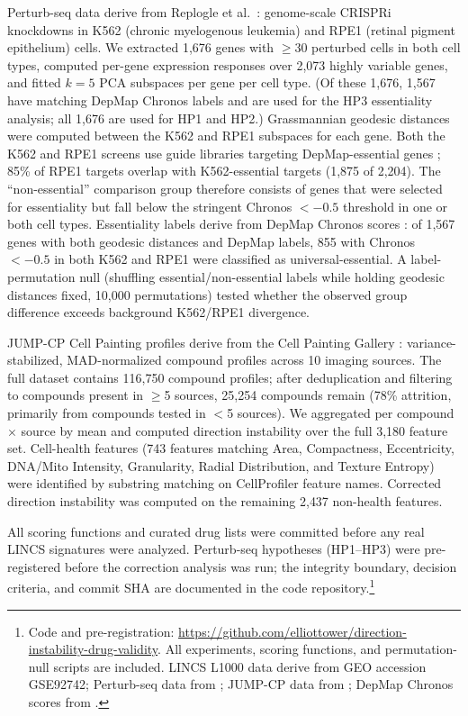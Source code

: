 \documentclass{article}
\begin{document}
Perturb-seq data derive from Replogle et al.\
\citep{replogle2022mapping}: genome-scale CRISPRi knockdowns in K562
(chronic myelogenous leukemia) and RPE1 (retinal pigment epithelium)
cells. We extracted 1{,}676 genes with $\geq$30 perturbed cells in both
cell types, computed per-gene expression responses over 2{,}073 highly
variable genes, and fitted $k = 5$ PCA subspaces per gene per cell type.
(Of these 1{,}676, 1{,}567 have matching DepMap Chronos labels and are
used for the HP3 essentiality analysis; all 1{,}676 are used for HP1 and
HP2.)
Grassmannian geodesic distances were computed between the K562 and RPE1
subspaces for each gene. Both the K562 and RPE1 screens use guide libraries
targeting DepMap-essential genes \citep{replogle2022mapping}; 85\% of RPE1
targets overlap with K562-essential targets (1{,}875 of 2{,}204). The
``non-essential'' comparison group therefore consists of genes that were
selected for essentiality but fall below the stringent Chronos $< -0.5$
threshold in one or both cell types. Essentiality labels derive from
DepMap Chronos scores \citep{dempster2021chronos}: of 1{,}567 genes with
both geodesic distances and DepMap labels, 855 with Chronos $< -0.5$ in
both K562 and RPE1 were classified as universal-essential. A
label-permutation null (shuffling essential/non-essential labels while
holding geodesic distances fixed, 10{,}000 permutations) tested whether
the observed group difference exceeds background K562/RPE1 divergence.

JUMP-CP Cell Painting profiles derive from the Cell Painting Gallery
\citep{chandrasekaran2023jump}: variance-stabilized, MAD-normalized
compound profiles across 10 imaging sources. The full dataset contains
116{,}750 compound profiles; after deduplication and filtering to compounds
present in $\geq$5 sources, 25{,}254 compounds remain (78\% attrition,
primarily from compounds tested in $<$5 sources). We aggregated per
compound $\times$ source by mean and computed direction instability over
the full 3{,}180 feature set. Cell-health features (743 features matching Area, Compactness,
Eccentricity, DNA/Mito Intensity, Granularity, Radial Distribution, and
Texture Entropy) were identified by substring matching on CellProfiler
feature names. Corrected direction instability was computed on the remaining
2{,}437 non-health features.

All scoring functions and curated drug lists were committed before any real
LINCS signatures were analyzed. Perturb-seq hypotheses (HP1--HP3) were
pre-registered before the correction analysis was run; the integrity
boundary, decision criteria, and commit SHA are documented in the
code repository.\footnote{Code and pre-registration:
\url{https://github.com/elliottower/direction-instability-drug-validity}.
All experiments, scoring functions, and permutation-null scripts are
included. LINCS L1000 data derive from GEO accession GSE92742;
Perturb-seq data from \citet{replogle2022mapping}; JUMP-CP data from
\citet{chandrasekaran2023jump}; DepMap Chronos scores from
\citet{dempster2021chronos}.}
\end{document}
